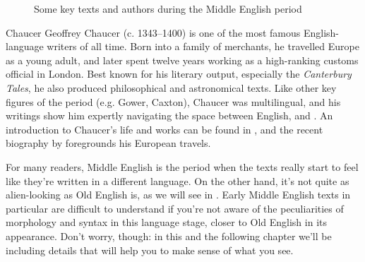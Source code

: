 \begin{figure}
     \caption{Some key texts and authors during the Middle English period}
     \label{fig:ME_locations}
\end{figure}



\begin{peoplebox}{Chaucer}
Geoffrey Chaucer (c. 1343--1400) is one of the most famous English-language writers of all time. Born into a family of merchants, he travelled Europe as a young adult, and later spent twelve years working as a high-ranking customs official in London. Best known for his literary output, especially the \emph{Canterbury Tales}, he also produced philosophical and astronomical texts. Like other key figures of the period (e.g. Gower, Caxton), Chaucer was multilingual, and his writings show him expertly navigating the space between English,  and  \citep{Davidson2010,Hsy2013}. An introduction to Chaucer's life and works can be found in \citet{Minnis2014}, and the recent biography by \citet{Turner2019} foregrounds his European travels.
\end{peoplebox}


\noindent For many readers, Middle English is the period when the texts really start to feel like they're written in a different language. On the other hand, it's not quite as alien-looking as Old English is, as we will see in . Early Middle English texts in particular are difficult to understand if you're not aware of the peculiarities of morphology and syntax in this language stage, closer to Old English in its appearance. Don't worry, though: in this and the following chapter we'll be including details that will help you to make sense of what you see.

